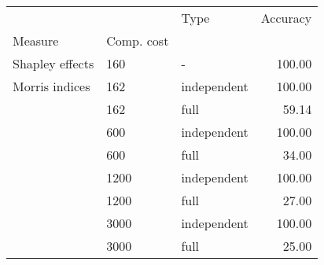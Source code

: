 \begin{tabular}{lllr}
\toprule
               &      &         Type &  Accuracy \\
Measure & Comp. cost &              &           \\
\midrule
Shapley effects & 160  &            - &    100.00 \\
Morris indices & 162  &  independent &    100.00 \\
               & 162  &         full &     59.14 \\
               & 600  &  independent &    100.00 \\
               & 600  &         full &     34.00 \\
               & 1200 &  independent &    100.00 \\
               & 1200 &         full &     27.00 \\
               & 3000 &  independent &    100.00 \\
               & 3000 &         full &     25.00 \\
\bottomrule
\end{tabular}
